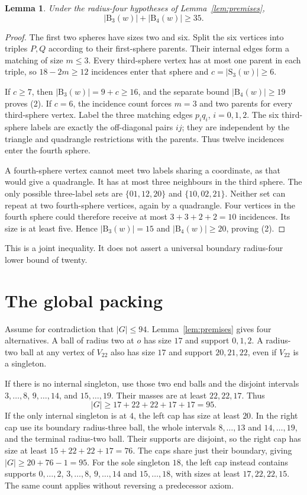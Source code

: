 \documentclass[11pt]{article}
\newtheorem{lemma}[theorem]{Lemma}
\newcommand{\B}{\mathrm B}
\newcommand{\Sph}{\mathrm S}
\begin{document}
\begin{lemma}\label{lem:mixed}
Under the radius-four hypotheses of Lemma~\ref{lem:premises},
\[
 |\B_3(w)|+|\B_4(w)|\geq35.                           \tag{2}
\]
\end{lemma}
\begin{proof}
The first two spheres have sizes two and six. Split the six vertices
into triples $P,Q$ according to their first-sphere parents. Their
internal edges form a matching of size $m\leq3$. Every third-sphere
vertex has at most one parent in each triple, so $18-2m\geq12$ incidences
enter that sphere and $c=|\Sph_3(w)|\geq6$.

If $c\geq7$, then $|\B_3(w)|=9+c\geq16$, and the separate bound
$|\B_4(w)|\geq19$ proves (2). If $c=6$, the incidence count forces
$m=3$ and two parents for every third-sphere vertex. Label the three
matching edges $p_iq_i$, $i=0,1,2$. The six third-sphere labels are
exactly the off-diagonal pairs $ij$; they are independent by the
triangle and quadrangle restrictions with the parents. Thus twelve
incidences enter the fourth sphere.

A fourth-sphere vertex cannot meet two labels sharing a coordinate,
as that would give a quadrangle. It has at most three neighbours in
the third sphere. The only possible three-label sets are
$\{01,12,20\}$ and $\{10,02,21\}$. Neither set can repeat at two
fourth-sphere vertices, again by a quadrangle. Four vertices in the
fourth sphere could therefore receive at most $3+3+2+2=10$ incidences.
Its size is at least five. Hence $|\B_3(w)|=15$ and
$|\B_4(w)|\geq20$, proving (2).
\end{proof}
This is a joint inequality. It does not assert a universal boundary
radius-four lower bound of twenty.

\section{The global packing}

Assume for contradiction that $|G|\leq94$. Lemma~\ref{lem:premises}
gives four alternatives. A ball of radius two at $o$ has size $17$ and
support $0,1,2$. A radius-two ball at any vertex of $V_{22}$ also has
size $17$ and support $20,21,22$, even if $V_{22}$ is a singleton.

If there is no internal singleton, use those two end balls and the
disjoint intervals $3,\ldots,8$, $9,\ldots,14$, and $15,\ldots,19$.
Their masses are at least $22,22,17$. Thus
\[
 |G|\geq17+22+22+17+17=95.
\]
If the only internal singleton is at $4$, the left cap has size at
least $20$. In the right cap use its boundary radius-three ball,
the whole intervals $8,\ldots,13$ and $14,\ldots,19$, and the terminal
radius-two ball. Their supports are disjoint, so the right cap has size
at least $15+22+22+17=76$. The caps share just their boundary, giving
$|G|\geq20+76-1=95$. For the sole singleton $18$, the left cap instead
contains supports $0,\ldots,2$, $3,\ldots,8$, $9,\ldots,14$ and
$15,\ldots,18$, with sizes at least $17,22,22,15$. The same count
applies without reversing a predecessor axiom.
\end{document}
